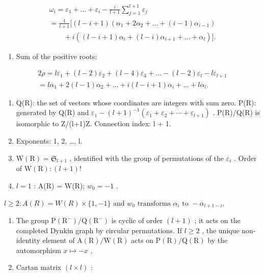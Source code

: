 \[
\begin{array}{l} \omega_ {i} = \varepsilon_ {1} + \dots + \varepsilon_ {i} - \frac {i}{l + 1} \sum_ {j = 1} ^ {l + 1} \varepsilon_ {j} \\ = \frac {1}{l + 1} [ (l - i + 1) (\alpha_ {1} + 2 \alpha_ {2} + \dots + (i - 1) \alpha_ {i - 1}) \\ \qquad + i ((l - i + 1) \alpha_ {i} + (l - i) \alpha_ {i + 1} + \dots + \alpha_ {l}) ]. \end{array}
\]

\begin{enumerate}
\def\labelenumi{(\Roman{enumi})}
\setcounter{enumi}{6}
\tightlist
\item
  Sum of the positive roots:
\end{enumerate}

\[
\begin{array}{c} 2 \rho = l \varepsilon_ {1} + (l - 2) \varepsilon_ {2} + (l - 4) \varepsilon_ {3} + \dots - (l - 2) \varepsilon_ {l} - l \varepsilon_ {l + 1} \\ = l \alpha_ {1} + 2 (l - 1) \alpha_ {2} + \dots + i (l - i + 1) \alpha_ {i} + \dots + l \alpha_ {l}. \end{array}
\]

\begin{enumerate}
\def\labelenumi{(\Roman{enumi})}
\setcounter{enumi}{7}
\item
  Q(R): the set of vectors whose coordinates are integers with sum zero. P(R): generated by Q(R) and \(\varepsilon_{1} - (l + 1)^{-1}(\varepsilon_{1} + \varepsilon_{2} + \cdots + \varepsilon_{l+1})\) . P(R)/Q(R) is isomorphic to Z/(l+1)Z. Connection index: l + 1.
\item
  Exponents: 1, 2, \ldots, l.
\item
  \(\mathrm{W}(\mathrm{R}) = \mathfrak{S}_{l + 1}\) , identified with the group of permutations of the \(\varepsilon_{i}\) . Order of \(\mathrm{W}(\mathrm{R})\colon (l + 1)!\)
\item
  \(l = 1\) : A(R) = W(R); \(w_0 = -1\) .
\end{enumerate}

\(l \geqslant 2: A(R) = W(R) \times \{1, -1\} \text{ and } w_{0} \text{ transforms } \alpha_{i} \text{ to } -\alpha_{l+1-i}.\)

\begin{enumerate}
\def\labelenumi{(\Roman{enumi})}
\setcounter{enumi}{11}
\item
  The group \(\mathrm{P}(\mathrm{R}^{-})/\mathrm{Q}(\mathrm{R}^{-})\) is cyclic of order \((l+1)\) ; it acts on the completed Dynkin graph by circular permutations. If \(l \geqslant 2\) , the unique non-identity element of \(\mathrm{A}(\mathrm{R})/\mathrm{W}(\mathrm{R})\) acts on \(\mathrm{P}(\mathrm{R})/\mathrm{Q}(\mathrm{R})\) by the automorphism \(x \mapsto -x\) .
\item
  Cartan matrix \((l \times l)\) :
\end{enumerate}

